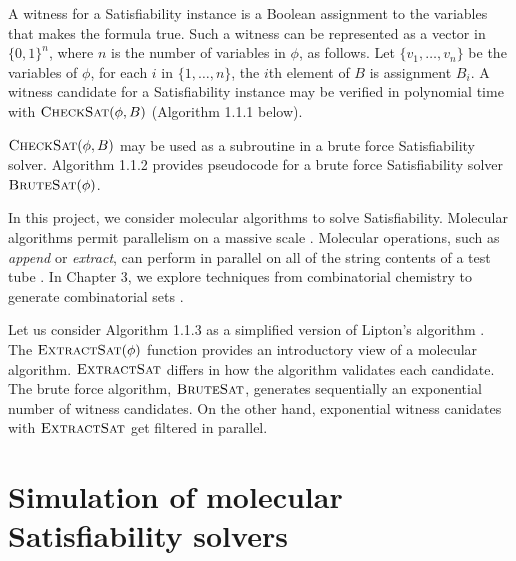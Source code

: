 A witness for a {\sc Satisfiability} instance is a Boolean assignment to the variables that makes the formula true.  Such a witness can be represented as a vector in $\{0,1\}^n$, where $n$ is the number of variables in $\phi$, as follows.  Let $\{v_1, \ldots , v_n\}$ be the variables of $\phi$, for each $i$ in $\{1, \ldots , n\}$, the $i$th element of $B$ is assignment $B_i$.   A witness candidate for a {\sc Satisfiability} instance may be verified in polynomial time with $\text{\sc CheckSat}(\phi, B)$ (Algorithm 1.1.1 below).

\FloatBarrier 



\FloatBarrier 

$\text{\sc CheckSat}(\phi, B)$ may be used as a subroutine in a brute force {\sc Satisfiability} solver.  Algorithm 1.1.2 provides pseudocode for a brute force {\sc Satisfiability} solver $\text{\sc BruteSat}(\phi)$.  

\FloatBarrier 



In this project, we consider molecular algorithms to solve {\sc Satisfiability}.  Molecular algorithms permit parallelism on a massive scale \cite{Adleman:1994:MCS:189441.189442, Lipton95usingdna}.  Molecular operations, such as \textit{append} or \textit{extract}, can perform in parallel on all of the string contents of a test tube \cite{Adleman:1994:MCS:189441.189442, Lipton95usingdna, dnaComputingModels2008}.  In Chapter 3, we explore techniques from combinatorial chemistry to generate combinatorial sets \cite{Lipton95usingdna, furkaBook, dnaComputingModels2008}.


\FloatBarrier 

Let us consider Algorithm 1.1.3 as a simplified version of Lipton's algorithm \cite{Lipton95usingdna, dnaComputingModels2008}.  The $\text{\sc ExtractSat}(\phi)$ function provides an introductory view of a molecular algorithm.  $\text{\sc ExtractSat}$ differs in how the algorithm validates each candidate.  The brute force algorithm, $\text{\sc BruteSat}$, generates sequentially an exponential number of witness candidates.  On the other hand, exponential witness canidates with $\text{\sc ExtractSat}$ get filtered in parallel.  
				
\section{Simulation of molecular {\sc Satisfiability} solvers}
	
